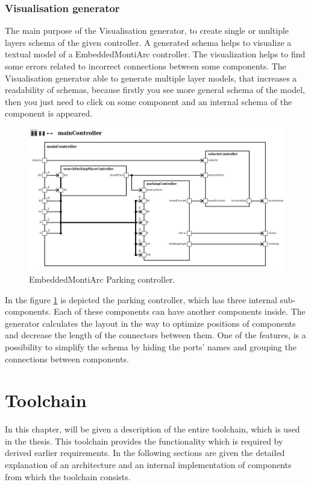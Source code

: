 \subsection{Visualisation generator} \label{sec:svggen}
The main purpose of the Visualisation generator, to create single or multiple layers schema of the given controller. A generated schema helps to visualize a textual model of a EmbeddedMontiArc controller. The visualization helps to find some errors related to incorrect connections between some components. The Visualisation generator able to generate multiple layer models, that increases a readability of schemas, because firstly you see more general schema of the model, then you just need to click on some component and an internal schema of the component is appeared.
\begin{figure}[h!]
    \centering
    \includegraphics[width=\linewidth]{src/pic/controller03}
    \caption{EmbeddedMontiArc Parking controller.}
    \label{fig:parkingCtrl}
\end{figure}
In the figure \ref{fig:parkingCtrl} is depicted the parking controller, which has three internal sub-components. Each of these components can have another components inside. The generator calculates the layout in the way to optimize positions of components and decrease the length of the connectors between them. One of the features, is a possibility to simplify the schema by hiding the ports' names and grouping the connections between components.

\chapter{Toolchain} \label{sec:toolchain}
In this chapter, will be given a description of the entire toolchain, which is used in the thesis. This toolchain provides the functionality which is required by derived earlier requirements. In the following sections are given the detailed explanation of an architecture and an internal implementation of components from which the toolchain consists.
